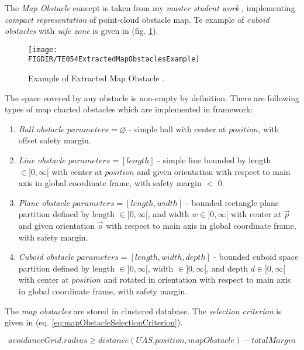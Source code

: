 The \emph{Map Obstacle} concept is taken from my \emph{master student work} \cite{cernamaria2018}, implementing \emph{compact representation} of point-cloud obstacle map. Te example of \emph{cuboid obstacles} with \emph{safe zone} is given in (fig. \ref{fig:exampleExtractedMapObstacles}).
    
\begin{figure}[H]
    \centering
    \texttt{[image: \\FIGDIR/TE054ExtractedMapObstaclesExample]}
    \caption{Example of Extracted Map Obstacle \cite{cernamaria2018}.}
    \label{fig:exampleExtractedMapObstacles}
\end{figure} 

\noindent The space covered by any obstacle  is non-empty by definition. There are following types of map charted obstacles which are implemented in framework:

\begin{enumerate}
    \item\emph{Ball obstacle $parameters=\varnothing$} - simple ball with center at $position$, with offset safety margin.
    
    \item\emph{Line obstacle $parameters=[length]$} - simple line bounded by length $\in]0,\infty[$ with center at $position$ and given orientation with respect to main axis in global coordinate frame, with safety margin $<$ 0.
    
    \item\emph{Plane obstacle $parameters=[length,width]$} - bounded rectangle plane partition defined by length $\in]0,\infty[$, and width $w\in]0,\infty[$ with center at $\vec{p}$ and given orientation $\vec{o}$ with respect to main axis in global coordinate frame, with safety margin.
    
    \item\emph{Cuboid obstacle $parameters=[length,width,depth]$} - bounded cuboid space partition defined by length $\in]0,\infty[$, width $\in]0,\infty[$, and depth $d\in]0,\infty[$ with center at $position$ and rotated in orientation with respect to main axis in global coordinate frame, with safety margin.
\end{enumerate}

\noindent The \emph{map obstacles} are stored in clustered database. The \emph{selection criterion} is given in (eq. \ref{eq:mapObstacleSelectionCriterion}).

\begin{equation}\label{eq:mapObstacleSelectionCriterion}
    avoidance Grid.radius \ge distance(UAS.position,map Obstacle) - total Margin
\end{equation}

